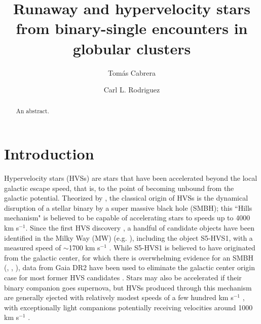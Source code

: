 \documentclass[twocolumn]{aastex631}
\begin{document}
\title{Runaway and hypervelocity stars from binary-single encounters in globular clusters}

\author[0000-0002-1270-7666]{Tom\'as Cabrera}

\author[0000-0003-4175-8881]{Carl L. Rodriguez}

\begin{abstract}
    An abstract.
\end{abstract}

\section{Introduction}
\label{sec:intro}

Hypervelocity stars (HVSs) are stars that have been accelerated beyond the local galactic escape speed, that is, to the point of becoming unbound from the galactic potential.
Theorized by \citealt{1988Natur.331..687H}, the classical origin of HVSs is the dynamical disruption of a stellar binary by a super massive black hole (SMBH); this ``Hills mechanism" is believed to be capable of accelerating stars to speeds up to 4000 km s$^{-1}$.
Since the first HVS discovery \citep{2005ApJ...622L..33B}, a handful of candidate objects have been identified in the Milky Way (MW) (e.g. \citealt{2014ApJ...787...89B}), including the object S5-HVS1, with a measured speed of $\sim$1700 km s$^{-1}$ \citep{2020MNRAS.491.2465K}.
While S5-HVS1 is believed to have originated from the galactic center, for which there is overwhelming evidence for an SMBH (\citealt{1998ApJ...509..678G}, \citealt{2018A&A...615L..15G}, \citealt{2022ApJ...930L..12E}), data from Gaia DR2 have been used to eliminate the galactic center origin case for most former HVS candidates \citep{2018MNRAS.479.2789B}.
Stars may also be accelerated if their binary companion goes supernova, but HVSs produced through this mechanism are generally ejected with relatively modest speeds of a few hundred km s$^{-1}$ \citep{2019A&A...624A..66R}, with exceptionally light companions potentially receiving velocities around 1000 km s$^{-1}$ \citep{2015MNRAS.448L...6T}.
\end{document}
